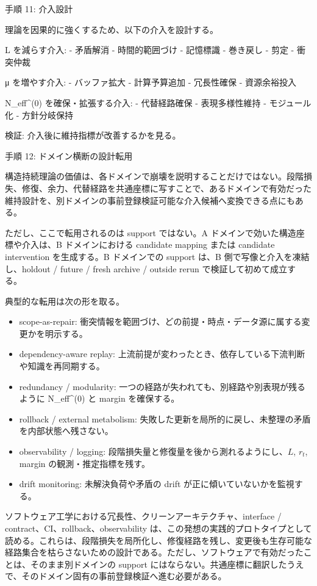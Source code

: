 \documentclass[12pt,a4paper]{article}
\begin{document}
手順 11: 介入設計

理論を因果的に強くするため、以下の介入を設計する。

L を減らす介入: - 矛盾解消 - 時間的範囲づけ - 記憶標識 - 巻き戻し - 剪定 - 衝突仲裁

μ を増やす介入: - バッファ拡大 - 計算予算追加 - 冗長性確保 - 資源余裕投入

N\_eff\^{}(0) を確保・拡張する介入: - 代替経路確保 - 表現多様性維持 - モジュール化 - 方針分岐保持

検証: 介入後に維持指標が改善するかを見る。

手順 12: ドメイン横断の設計転用

構造持続理論の価値は、各ドメインで崩壊を説明することだけではない。段階損失、修復、余力、代替経路を共通座標に写すことで、あるドメインで有効だった維持設計を、別ドメインの事前登録検証可能な介入候補へ変換できる点にもある。

ただし、ここで転用されるのは support ではない。A ドメインで効いた構造座標や介入は、B ドメインにおける candidate mapping または candidate intervention を生成する。B ドメインでの support は、B 側で写像と介入を凍結し、holdout / future / fresh archive / outside rerun で検証して初めて成立する。

典型的な転用は次の形を取る。

\begin{itemize}
\tightlist
\item
  scope-as-repair: 衝突情報を範囲づけ、どの前提・時点・データ源に属する変更かを明示する。
\item
  dependency-aware replay: 上流前提が変わったとき、依存している下流判断や知識を再同期する。
\item
  redundancy / modularity: 一つの経路が失われても、別経路や別表現が残るように N\_eff\^{}(0) と margin を確保する。
\item
  rollback / external metabolism: 失敗した更新を局所的に戻し、未整理の矛盾を内部状態へ残さない。
\item
  observability / logging: 段階損失量と修復量を後から測れるようにし、\(L\), \(r_{t}\), margin の観測・推定指標を残す。
\item
  drift monitoring: 未解決負荷や矛盾の drift が正に傾いていないかを監視する。
\end{itemize}

ソフトウェア工学における冗長性、クリーンアーキテクチャ、interface / contract、CI、rollback、observability は、この発想の実践的プロトタイプとして読める。これらは、段階損失を局所化し、修復経路を残し、変更後も生存可能な経路集合を枯らさないための設計である。ただし、ソフトウェアで有効だったことは、そのまま別ドメインの support にはならない。共通座標に翻訳したうえで、そのドメイン固有の事前登録検証へ進む必要がある。
\end{document}
